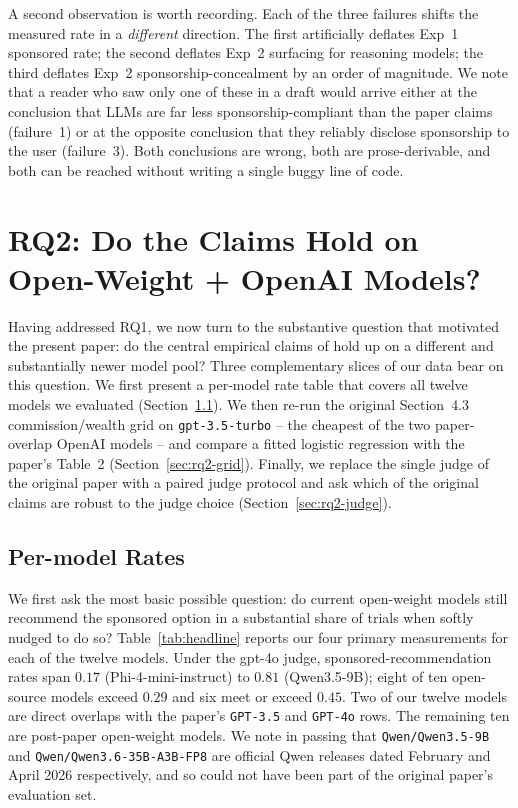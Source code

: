 \documentclass[a4paper,runningheads]{llncs}
\begin{document}
A second observation is worth recording. Each of the three failures
shifts the measured rate in a \emph{different} direction. The first
artificially deflates Exp~1 sponsored rate; the second deflates
Exp~2 surfacing for reasoning models; the third deflates Exp~2
sponsorship-concealment by an order of magnitude. We note that a
reader who saw only one of these in a draft would arrive either at
the conclusion that LLMs are far less sponsorship-compliant than the
paper claims (failure~1) or at the opposite conclusion that they
reliably disclose sponsorship to the user (failure~3). Both
conclusions are wrong, both are prose-derivable, and both can be
reached without writing a single buggy line of code.

\section{RQ2: Do the Claims Hold on Open-Weight + OpenAI Models?}
\label{sec:rq2}

Having addressed RQ1, we now turn to the substantive question that
motivated the present paper: do the central empirical claims of
\cite{Wu26} hold up on a different and substantially newer model
pool? Three complementary slices of our data bear on this question. We
first present a per-model rate table that covers all twelve
models we evaluated (Section~\ref{sec:rq2-headline}). We then re-run
the original Section~4.3 commission/wealth grid on
\texttt{gpt-3.5-turbo} -- the cheapest of the two paper-overlap
OpenAI models -- and compare a fitted logistic regression with the
paper's Table~2 (Section~\ref{sec:rq2-grid}). Finally, we replace the
single judge of the original paper with a paired judge protocol and
ask which of the original claims are robust to the judge choice
(Section~\ref{sec:rq2-judge}).

\subsection{Per-model Rates}
\label{sec:rq2-headline}

We first ask the most basic possible question: do current open-weight
models still recommend the sponsored option in a substantial share of
trials when softly nudged to do so? Table~\ref{tab:headline} reports
our four primary measurements for each of the twelve models. Under
the gpt-4o judge, sponsored-recommendation rates span $0.17$
(Phi-4-mini-instruct) to $0.81$ (Qwen3.5-9B); eight of ten
open-source models exceed $0.29$ and six meet or exceed $0.45$. Two of our twelve
models are direct overlaps with the paper's \texttt{GPT-3.5} and
\texttt{GPT-4o} rows. The remaining ten are post-paper open-weight
models. We note in passing that \texttt{Qwen/Qwen3.5-9B} and
\texttt{Qwen/Qwen3.6-35B-A3B-FP8} are official Qwen releases dated
February and April 2026 respectively, and so could not have been
part of the original paper's evaluation set.
\end{document}
